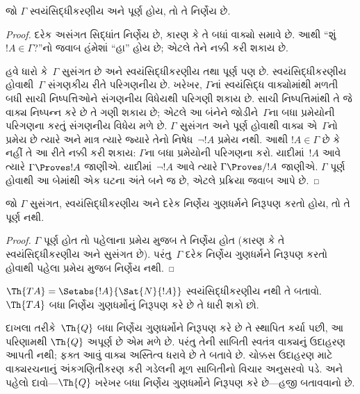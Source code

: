 \begin{thm}
જો $\Gamma$ સ્વયંસિદ્ધીકરણીય અને
પૂર્ણ હોય, તો તે નિર્ણેય છે.
\end{thm}

\begin{proof}
દરેક અસંગત સિદ્ધાંત નિર્ણેય છે,
કારણ કે તે બધાં વાક્યો સમાવે છે.
આથી ``શું $!A \in \Gamma$?''નો જવાબ
હંમેશાં ``હા'' હોય છે; એટલે તેને નક્કી
કરી શકાય છે.

હવે ધારો કે~$\Gamma$ સુસંગત છે અને
સ્વયંસિદ્ધીકરણીય તથા પૂર્ણ પણ છે.
સ્વયંસિદ્ધીકરણીય હોવાથી~$\Gamma$
સંગણકીય રીતે પરિગણનીય છે. ખરેખર,
$\Gamma$નાં સ્વયંસિદ્ધ વાક્યોમાંથી મળતી
બધી સાચી નિષ્પત્તિઓને સંગણનીય
વિધેયથી પરિગણી શકાય છે. સાચી
નિષ્પત્તિમાંથી તે જે વાક્ય
નિષ્પન્ન કરે છે તે ગણી શકાય છે;
એટલે આ બંનેને જોડીને~$\Gamma$ના બધા
પ્રમેયોની પરિગણના કરતું સંગણનીય વિધેય
મળે છે. $\Gamma$ સુસંગત અને પૂર્ણ
હોવાથી વાક્ય એ~$\Gamma$નો પ્રમેય છે ત્યારે અને
માત્ર ત્યારે જ્યારે તેનો નિષેધ~$\lnot !A$ પ્રમેય નથી.
આથી $!A \in \Gamma$ છે કે નહીં તે
આ રીતે નક્કી કરી શકાય: $\Gamma$ના
બધા પ્રમેયોની પરિગણના કરો. યાદીમાં~$!A$
આવે ત્યારે $\Gamma \Proves !A$ જાણીએ.
યાદીમાં~$\lnot !A$ આવે ત્યારે
$\Gamma \Proves/ !A$ જાણીએ. $\Gamma$
પૂર્ણ હોવાથી આ બેમાંથી એક ઘટના
અંતે બને જ છે, એટલે પ્રક્રિયા જવાબ આપે છે.
\end{proof}

\begin{cor}
જો $\Gamma$ સુસંગત, સ્વયંસિદ્ધીકરણીય
અને દરેક નિર્ણેય ગુણધર્મને
નિરૂપણ કરતો હોય, તો તે
પૂર્ણ નથી.
\end{cor}

\begin{proof}
$\Gamma$ પૂર્ણ હોત તો
પહેલાના પ્રમેય મુજબ તે નિર્ણેય
હોત (કારણ કે તે સ્વયંસિદ્ધીકરણીય
અને સુસંગત છે). પરંતુ~$\Gamma$
દરેક નિર્ણેય ગુણધર્મને
નિરૂપણ કરતો હોવાથી પહેલા
પ્રમેય મુજબ નિર્ણેય નથી.
\end{proof}

\begin{prob}
$\Th{TA} = \Setabs{!A}{\Sat{N}{!A}}$
સ્વયંસિદ્ધીકરણીય નથી તે બતાવો.
$\Th{TA}$ બધા નિર્ણેય ગુણધર્મોનું
નિરૂપણ કરે છે તે ધારી શકો છો.
\end{prob}

દાખલા તરીકે~$\Th{Q}$ બધા
નિર્ણેય ગુણધર્મોને નિરૂપણ
કરે છે તે સ્થાપિત કર્યા પછી, આ પરિણામથી
$\Th{Q}$ અપૂર્ણ છે એમ મળે છે. પરંતુ તેની
સાબિતી સ્વતંત્ર વાક્યનું ઉદાહરણ
આપતી નથી; ફક્ત આવું વાક્ય
અસ્તિત્વ ધરાવે છે તે બતાવે છે. ચોક્કસ
ઉદાહરણ માટે વાક્યરચનાનું અંકગણિતીકરણ
કરી ગડેલની મૂળ સાબિતીનો વિચાર અનુસરવો
પડે. અને પહેલો દાવો—$\Th{Q}$ ખરેખર
બધા નિર્ણેય ગુણધર્મોને
નિરૂપણ કરે છે—હજી બતાવવાનો છે.

